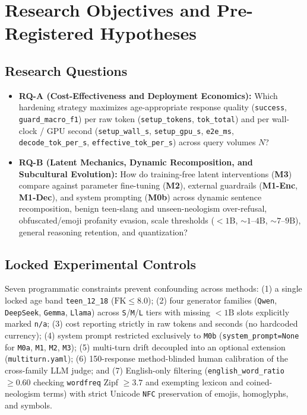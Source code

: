 \documentclass[11pt,letterpaper]{article}
\begin{document}
\section{Research Objectives and Pre-Registered Hypotheses}

\subsection{Research Questions}
\begin{itemize}[leftmargin=1.5em]
    \item \textbf{RQ-A (Cost-Effectiveness and Deployment Economics):} Which hardening strategy maximizes age-appropriate response quality (\texttt{success}, \texttt{guard\_macro\_f1}) per raw token (\texttt{setup\_tokens}, \texttt{tok\_total}) and per wall-clock / GPU second (\texttt{setup\_wall\_s}, \texttt{setup\_gpu\_s}, \texttt{e2e\_ms}, \texttt{decode\_tok\_per\_s}, \texttt{effective\_tok\_per\_s}) across query volumes $N$?
    \item \textbf{RQ-B (Latent Mechanics, Dynamic Recomposition, and Subcultural Evolution):} How do training-free latent interventions (\textbf{M3}) compare against parameter fine-tuning (\textbf{M2}), external guardrails (\textbf{M1-Enc}, \textbf{M1-Dec}), and system prompting (\textbf{M0b}) across dynamic sentence recomposition, benign teen-slang and unseen-neologism over-refusal, obfuscated/emoji profanity evasion, scale thresholds ($<1\text{B}$, $\sim 1\text{--}4\text{B}$, $\sim 7\text{--}9\text{B}$), general reasoning retention, and quantization?
\end{itemize}

\subsection{Locked Experimental Controls}
Seven programmatic constraints prevent confounding across methods: (1) a single locked age band \texttt{teen\_12\_18} ($\text{FK} \le 8.0$); (2) four generator families (\texttt{Qwen}, \texttt{DeepSeek}, \texttt{Gemma}, \texttt{Llama}) across \texttt{S}/\texttt{M}/\texttt{L} tiers with missing $<1\text{B}$ slots explicitly marked \texttt{n/a}; (3) cost reporting strictly in raw tokens and seconds (no hardcoded currency); (4) system prompt restricted exclusively to \texttt{M0b} (\texttt{system\_prompt=None} for \texttt{M0a}, \texttt{M1}, \texttt{M2}, \texttt{M3}); (5) multi-turn drift decoupled into an optional extension (\texttt{multiturn.yaml}); (6) 150-response method-blinded human calibration of the cross-family LLM judge; and (7) English-only filtering (\texttt{english\_word\_ratio} $\ge 0.60$ checking \texttt{wordfreq} Zipf $\ge 3.7$ and exempting lexicon and coined-neologism terms) with strict Unicode \texttt{NFC} preservation of emojis, homoglyphs, and symbols.
\end{document}

